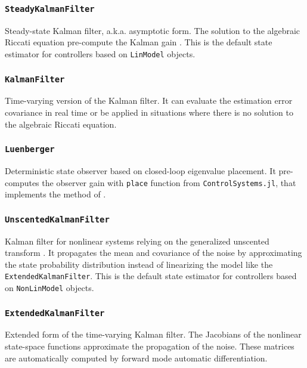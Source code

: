 \subsubsection{\textnormal{\texttt{SteadyKalmanFilter}}}
Steady-state Kalman filter, a.k.a. asymptotic form. The solution to the algebraic Riccati equation pre-compute the Kalman gain \citep{simon}. This is the default state estimator for controllers based on \texttt{LinModel} objects.

\subsubsection{\textnormal{\texttt{KalmanFilter}}}
Time-varying version of the Kalman filter. It can evaluate the estimation error covariance in real time or be applied in situations where there is no solution to the algebraic Riccati equation.

\subsubsection{\textnormal{\texttt{Luenberger}}}
Deterministic state observer based on closed-loop eigenvalue placement. It pre-computes the observer gain with \texttt{place} function from \texttt{ControlSystems.jl}, that implements the method of \citet{placePoles}.

\subsubsection{\textnormal{\texttt{UnscentedKalmanFilter}}}
Kalman filter for nonlinear systems relying on the generalized unscented transform \citep{simon}. It propagates the mean and covariance of the noise by approximating the state probability distribution instead of linearizing the model like the \texttt{ExtendedKalmanFilter}. This is the default state estimator for controllers based on \texttt{NonLinModel} objects.

\subsubsection{\textnormal{\texttt{ExtendedKalmanFilter}}}
Extended form of the time-varying Kalman filter. The Jacobians of the nonlinear state-space functions approximate the propagation of the noise. These matrices are automatically computed by forward mode automatic differentiation.

